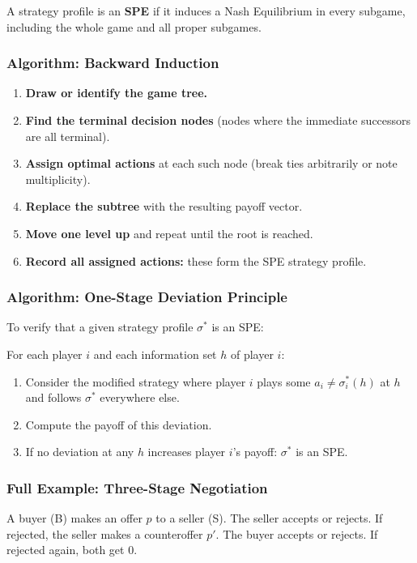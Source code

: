 \documentclass[hidelinks]{article}
\begin{document}
A strategy profile is an \textbf{SPE} if it induces a Nash Equilibrium in every subgame, including the whole game and all proper subgames.

\subsubsection{Algorithm: Backward Induction}

\begin{enumerate}
    \item \textbf{Draw or identify the game tree.}
    \item \textbf{Find the terminal decision nodes} (nodes where the immediate successors are all terminal).
    \item \textbf{Assign optimal actions} at each such node (break ties arbitrarily or note multiplicity).
    \item \textbf{Replace the subtree} with the resulting payoff vector.
    \item \textbf{Move one level up} and repeat until the root is reached.
    \item \textbf{Record all assigned actions:} these form the SPE strategy profile.
\end{enumerate}

\subsubsection{Algorithm: One-Stage Deviation Principle}

To verify that a given strategy profile $\sigma^*$ is an SPE:

For each player $i$ and each information set $h$ of player $i$:
\begin{enumerate}
    \item Consider the modified strategy where player $i$ plays some $a_i \neq \sigma_i^*(h)$ at $h$ and follows $\sigma^*$ everywhere else.
    \item Compute the payoff of this deviation.
    \item If no deviation at any $h$ increases player $i$'s payoff: $\sigma^*$ is an SPE.
\end{enumerate}

\subsubsection{Full Example: Three-Stage Negotiation}

A buyer (B) makes an offer $p$ to a seller (S). The seller accepts or rejects. If rejected, the seller makes a counteroffer $p'$. The buyer accepts or rejects. If rejected again, both get $0$.
\end{document}
